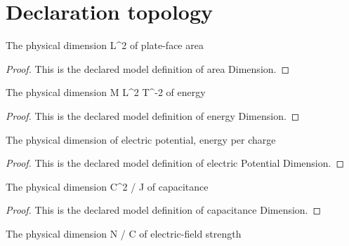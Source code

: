 \section{Declaration topology}
\begin{definition}
  \label{def:physics:phyx-mini-0908:phyxminiproblems-problemphyxmini0908-areadimension}
  The physical dimension L\textasciicircum{}2 of plate-face area
\end{definition}
\begin{proof}
  This is the declared model definition of area Dimension.
\end{proof}
\begin{definition}
  \label{def:physics:phyx-mini-0908:phyxminiproblems-problemphyxmini0908-energydimension}
  The physical dimension M L\textasciicircum{}2 T\textasciicircum{}-2 of energy
\end{definition}
\begin{proof}
  This is the declared model definition of energy Dimension.
\end{proof}
\begin{definition}
  \label{def:physics:phyx-mini-0908:phyxminiproblems-problemphyxmini0908-electricpotentialdimension}
  The physical dimension of electric potential, energy per charge
\end{definition}
\begin{proof}
  This is the declared model definition of electric Potential Dimension.
\end{proof}
\begin{definition}
  \label{def:physics:phyx-mini-0908:phyxminiproblems-problemphyxmini0908-capacitancedimension}
  The physical dimension C\textasciicircum{}2 / J of capacitance
\end{definition}
\begin{proof}
  This is the declared model definition of capacitance Dimension.
\end{proof}
\begin{definition}
  \label{def:physics:phyx-mini-0908:phyxminiproblems-problemphyxmini0908-electricfieldstrengthdimension}
  The physical dimension N / C of electric-field strength
\end{definition}
